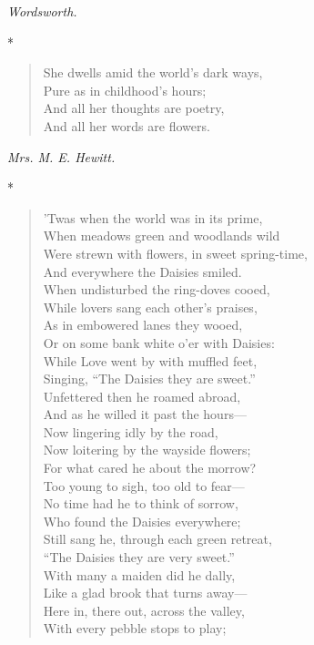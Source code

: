 \documentclass[11pt,twoside]{article}
\newcommand\stars{\begin{center}*\quad*\quad*\end{center}}
\newcommand\by[1]{\par\hfill\textit{#1}\par}
\begin{document}
\by{Wordsworth.}

\stars

\begin{verse}
She dwells amid the world’s dark ways,\\
\quad Pure as in childhood’s hours;\\
And all her thoughts are poetry,\\
\quad And all her words are flowers.
\end{verse}

\by{Mrs. M. E. Hewitt.}

\stars

\begin{verse}
’Twas when the world was in its prime,\\
\quad When meadows green and woodlands wild\\
Were strewn with flowers, in sweet spring-time,\\
\quad And everywhere the Daisies smiled.\\
When undisturbed the ring-doves cooed,\\
\quad While lovers sang each other’s praises,\\
As in embowered lanes they wooed,\\
\quad Or on some bank white o’er with Daisies:\\
While Love went by with muffled feet,\\
Singing, “The Daisies they are sweet.”\\
Unfettered then he roamed abroad,\\
\quad And as he willed it past the hours---\\
Now lingering idly by the road,\\
\quad Now loitering by the wayside flowers;\\
For what cared he about the morrow?\\
\quad Too young to sigh, too old to fear---\\
No time had he to think of sorrow,\\
\quad Who found the Daisies everywhere;\\
Still sang he, through each green retreat,\\
“The Daisies they are very sweet.”\\
With many a maiden did he dally,\\
\quad Like a glad brook that turns away---\\
Here in, there out, across the valley,\\
\quad With every pebble stops to play;\\

\end{verse}
\end{document}

